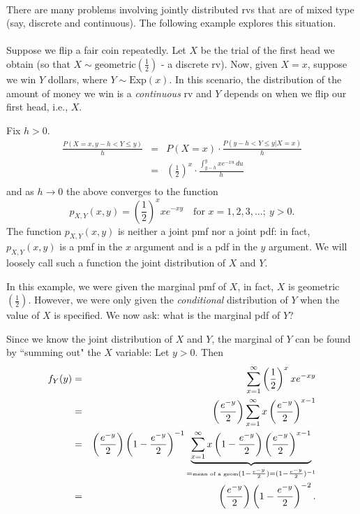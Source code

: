 \documentclass[12pt]{article}
\begin{document}
\newpage

\\
There are many problems involving jointly distributed rvs that are of mixed type (say, discrete and continuous). The following example explores this situation.\\

\label{jointmixtureexample}\\
Suppose we flip a fair coin repeatedly.  Let $X$ be the trial of the first head we obtain (so that $X\sim \mbox{geometric}(\frac 12)$ - a discrete rv).
Now, given $X=x$,
suppose we win $Y$ dollars, where $Y\sim \mbox{Exp}(x)$.
In this scenario, the distribution of the amount of money we win is a {\em continuous} rv and $Y$ depends on when we flip our first head, i.e., $X$.

Fix $h>0$.
\begin{eqnarray*}
\frac {P\!\left( X=x, y-h< Y\le y \right)}h &=& P(X=x)\cdot \frac {P(y-h<Y\le y|X=x)}h\\
&=& \left(\frac 12\right)^{x}\cdot \frac {\int_{y-h}^y xe^{-xu}\,du}h\\
\end{eqnarray*}
and as $h\to 0$ the above converges to the function
$$p_{X,Y}(x,y) = \left(\frac 12\right)^{x}xe^{-xy}\quad \mbox{for }x=1,2,3,\dots;\ y>0.$$
The function $p_{X,Y}(x,y)$ is neither a joint pmf nor a joint pdf: in fact, $p_{X,Y}(x,y)$ is a pmf in the $x$ argument and is a pdf in the $y$ argument.
We will loosely call such a function the joint distribution of $X$ and $Y$.

In this example, we were given the marginal pmf of $X$, in fact, $X$ is geometric$(\frac 12)$. However, we were only given the {\em conditional} distribution of $Y$
when the value of $X$ is specified.  We now ask: what is the marginal pdf of $Y$?

Since we know the joint distribution of $X$ and $Y$, the marginal of $Y$ can be found by ``summing out" the $X$ variable:
Let $y>0$. Then
\begin{eqnarray*}
f_Y(y) &=& \sum_{x=1}^{\infty} \left(\frac 12\right)^{x}xe^{-xy}\\
&=& \left(\frac {e^{-y}}2\right)\sum_{x=1}^{\infty} x\left(\frac {e^{-y}}2\right)^{x-1}\\
&=& \left(\frac {e^{-y}}2\right)\left( 1-\frac {e^{-y}}2 \right)^{-1}\underbrace{\sum_{x=1}^{\infty} x\left( 1- \frac {e^{-y}}2 \right)\left(\frac {e^{-y}}2\right)^{x-1}}_{=\mbox{\tiny mean of a geom}(1- \frac {e^{-y}}{2})=(1- \frac {e^{-y}}{2})^{-1}}\\
&=& \left(\frac {e^{-y}}2\right)\left( 1-\frac {e^{-y}}2 \right)^{-2}.\\
\end{eqnarray*}
\end{document}
